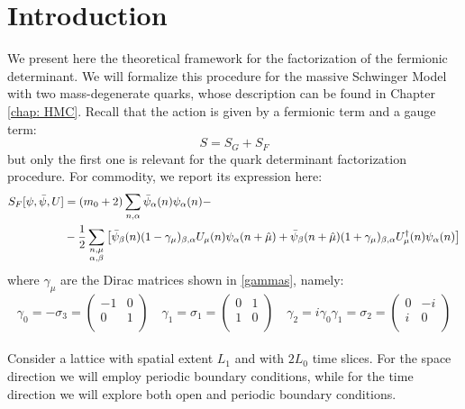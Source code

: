 \section{Introduction}
We present here the theoretical framework for the factorization of the fermionic determinant. We will formalize this procedure for the massive Schwinger Model with two mass-degenerate quarks, whose description can be found in Chapter \ref{chap: HMC}. Recall that the action is given by a fermionic term and a gauge term:
\begin{equation}
    S = S_G + S_F
\end{equation}
but only the first one is relevant for the quark determinant factorization procedure. For commodity, we report its expression here:
\begin{equation}\label{S_Ferm}
\begin{split}
    S_F [\psi, \Bar{\psi}, U] &= (m_0 + 2) \sum_{n, \alpha} \Bar{\psi}_\alpha(n)\psi_\alpha(n) -  \\  
        & - \frac{1}{2}\sum_{\substack{n, \mu \\ \alpha, \beta}}\left[ \Bar{\psi}_\beta(n)(1 - \gamma_\mu)_{\beta, \alpha} U_\mu(n) \psi_\alpha(n + \hat{\mu}) + \Bar{\psi}_\beta (n+\hat{\mu}) (1 + \gamma_\mu)_{\beta, \alpha} U^\dagger_\mu(n) \psi_\alpha(n) \right] \\
\end{split}
\end{equation}
where $\gamma_\mu$ are the Dirac matrices shown in \eqref{gammas}, namely:
\begin{equation}
    \gamma_0 = - \sigma_3 = \begin{pmatrix}
 -1 & 0  \\
   0 & 1 \\
\end{pmatrix}
   \,\,\,\,\,\, \gamma_1 = \sigma_1 = \begin{pmatrix}
 0 & 1  \\
   1 & 0 \\
\end{pmatrix}
   \,\,\,\,\,\, \gamma_2 = i\gamma_0 \gamma_1 = \sigma_2 = \begin{pmatrix}
 0 & -i  \\
   i & 0 \\
\end{pmatrix}
\end{equation}
\\ Consider a lattice with spatial extent $L_1$ and with $2L_0$ time slices. For the space direction we will employ periodic boundary conditions, while for the time direction we will explore both open and periodic boundary conditions.
